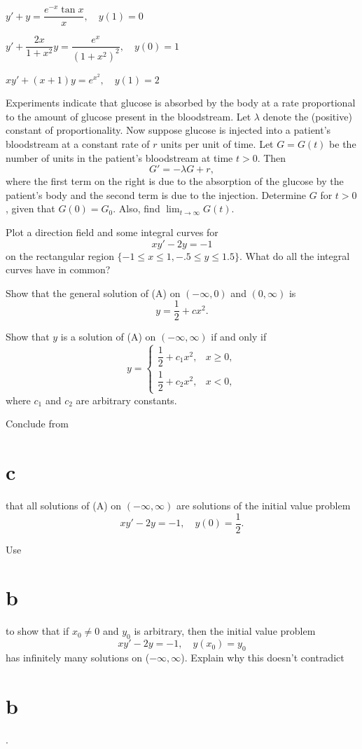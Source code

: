\begin{exerciselist}
\item\label{exer:2.1.40}$y'+y=\dfrac{e^{-x}\tan x}{x},\quad y(1)=0$

\item\label{exer:2.1.41}$y'+\dfrac{2x}{1+x^2}y=\dfrac{e^x}{(1+x^2)^2}, \quad y(0)=1$

\item\label{exer:2.1.42}$xy'+(x+1)y=e^{x^2},\quad y(1)=2$

\item\label{exer:2.1.43}Experiments indicate that glucose is absorbed by the body at a rate
proportional to the amount of glucose present in the bloodstream. Let
$\lambda$ denote the (positive) constant of proportionality. Now
suppose   glucose is injected into a patient's bloodstream at a
constant rate of $r$ units per unit of time. Let $G=G(t)$ be the
number of units in the patient's bloodstream at time $t>0$. Then
\[
G'=-\lambda G+r,
\]
where the first term on the right is due to the absorption of the
glucose by the patient's body and the second term is due to the
injection. Determine $G$ for $t>0$, given that $G(0)=G_0$. Also,
find $\lim_{t\to\infty}G(t)$.


\item\label{exer:2.1.44}\begin{alist}
\item %
\Lex Plot a direction field and some integral curves for
\[
xy'-2y=-1\tag{A}
\]
on the rectangular region  $\{-1\le x\le 1, -.5\le y\le 1.5\}$.
What do all the integral curves have in common?
\item %
Show that the general solution of (A)
on $(-\infty,0)$ and $(0,\infty)$ is
\[
y=\frac{1}{2}+cx^2.
\]
\item %
Show that $y$ is a solution of (A) on
$(-\infty,\infty)$ if and only if
\[
y=\begin{cases}
\dfrac{1}{2}+c_1x^2, &x \ge 0,\\
\dfrac{1}{2}+c_2x^2, &x < 0,
\end{cases}
\]
 where $c_1$ and $c_2$ are arbitrary constants.
\item %
Conclude from \part{c} that all solutions of (A) on
$(-\infty,\infty)$ are solutions of the initial value problem
\[
xy'-2y=-1,\quad y(0)=\frac{1}{2}.
\]
\item %
Use \part{b} to show that if  $x_0\ne0$ and $y_0$  is arbitrary, then
  the  initial value problem
\[
xy'-2y=-1,\quad y(x_0)=y_0
\]
has infinitely many solutions on ($-\infty,\infty$). Explain why this
doesn't contradict \part{b}.
\end{alist}



\end{exerciselist}

